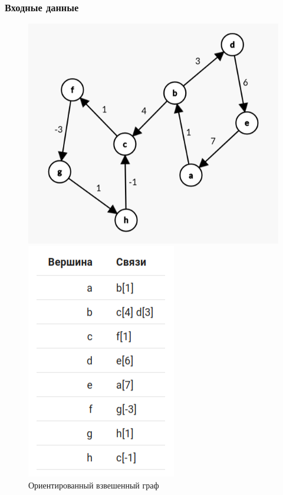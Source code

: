 \subsubsection{Входные данные}
\begin{figure}[H]
  \begin{minipage}{0.5\textwidth}
    \centering\includegraphics[width=0.8\linewidth]{figs/task-10/graph-10.png}
  \end{minipage}
  \begin{minipage}{0.5\textwidth}
    \centering\includegraphics[width=0.5\linewidth]{figs/task-10/adj-10.png}
  \end{minipage}
  \caption{Ориентированный взвешенный граф}
\end{figure}

